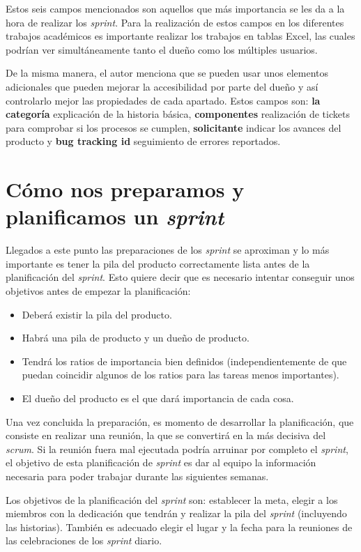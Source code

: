 Estos seis campos mencionados son aquellos que más importancia se les da a la hora de realizar los \textit{sprint}. Para la realización de estos campos en los diferentes trabajos académicos es importante realizar los trabajos en tablas Excel, las cuales podrían ver simultáneamente tanto el dueño como los múltiples usuarios.


De la misma manera, el autor menciona que se pueden usar unos elementos adicionales que pueden mejorar la accesibilidad por parte del dueño y así controlarlo mejor las propiedades de cada apartado. Estos campos son: \textbf{la categoría} explicación de la historia básica, \textbf{componentes} realización de tickets para comprobar si los procesos se cumplen, \textbf{solicitante} indicar los avances del producto y \textbf{bug tracking id} seguimiento de errores reportados.

\section{Cómo nos preparamos y planificamos un \textit{sprint}}
Llegados a este punto las preparaciones de los \textit{sprint} se aproximan y lo más importante es tener la pila del producto correctamente lista antes de la planificación del  \textit{sprint}.
Esto quiere decir que es necesario intentar conseguir unos objetivos antes de empezar la
planificación:
\begin{itemize}
	\item Deberá existir la pila del producto.
	\item Habrá una pila de producto y un dueño de producto.
	\item Tendrá los ratios de importancia bien definidos (independientemente de que puedan
coincidir algunos de los ratios para las tareas menos importantes).
 	\item El dueño del producto es el que dará importancia de cada cosa.
\end{itemize}

Una vez concluida la preparación, es momento de desarrollar la planificación, que consiste en realizar una reunión, la que se convertirá en la más decisiva del \textit{scrum}. Si la reunión fuera mal ejecutada podría arruinar por completo el \textit{sprint}, el objetivo de esta planificación de \textit{sprint} es dar al equipo la información necesaria para poder trabajar durante las siguientes semanas.

Los objetivos de la planificación del \textit{sprint} son: establecer la meta, elegir a los miembros con la dedicación que tendrán y realizar la pila del \textit{sprint} (incluyendo las historias). También es adecuado elegir el lugar y la fecha para la reuniones de las celebraciones de los \textit{sprint} diario.

